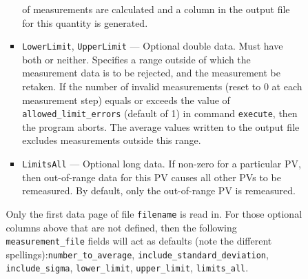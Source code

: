 \begin{itemize}
\begin{itemize}
\begin{itemize}
\begin{itemize}
                of measurements are calculated and a column in the output file for this quantity
                is generated.
                \item {\verb+LowerLimit+}, {\verb+UpperLimit+} --- Optional double data. Must have
                both or neither. Specifies a range outside of which the measurement
                data is to be rejected, and the measurement be retaken.
                If the number of invalid measurements (reset to 0 at each
                measurement step) equals or exceeds the value
                of {\verb+allowed_limit_errors+} (default of 1) in command {\verb+execute+}, 
                then the program aborts.
                The average values written to the output file excludes measurements outside this range.
                \item {\verb+LimitsAll+} --- Optional long data. If non-zero for a particular PV, then 
                out-of-range data for this PV causes all other PVs to be remeasured. 
                By default, only the out-of-range PV is remeasured.
        \end{itemize}
                Only the first data page of file {\verb+filename+} is read in. For those
                optional columns above that are not defined, then the following {\verb+measurement_file+} fields
                will act as defaults (note the different spellings):{\verb+number_to_average+}, 
                {\verb+include_standard_deviation+}, {\verb+include_sigma+}, 
                {\verb+lower_limit+}, {\verb+upper_limit+}, {\verb+limits_all+}.
\end{itemize}



\end{itemize}
\end{itemize}
